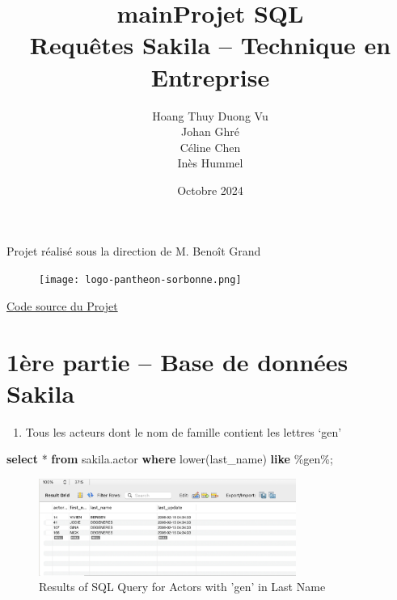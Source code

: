 \documentclass[12pt, french]{article}
\title{main}
\title{\textbf{Projet SQL \\ Requêtes Sakila -- Technique en Entreprise}}
\author{Hoang Thuy Duong Vu \\
        Johan Ghré \\
        Céline Chen \\
        Inès Hummel}
\date{Octobre 2024}
\providecommand{\tightlist}{%
      \setlength{\itemsep}{0pt}\setlength{\parskip}{0pt}}
\newenvironment{Shaded}{}{}
\newcommand{\KeywordTok}[1]{\textcolor[rgb]{0.00,0.44,0.13}{\textbf{{#1}}}}
\newcommand{\StringTok}[1]{\textcolor[rgb]{0.25,0.44,0.63}{{#1}}}
\newcommand{\FunctionTok}[1]{\textcolor[rgb]{0.02,0.16,0.49}{{#1}}}
\newcommand{\NormalTok}[1]{{#1}}
\newcommand{\OperatorTok}[1]{\textcolor[rgb]{0.40,0.40,0.40}{{#1}}}
\begin{document}
\onehalfspacing
\justifying
\maketitle
\thispagestyle{empty}

\vfill
\begin{center}
    Projet réalisé sous la direction de M. Benoît Grand
\end{center}


\begin{figure}[!t] 
    \centering
    \texttt{[image: logo-pantheon-sorbonne.png]}
    \label{Panthéon Sorbonne}
\end{figure}

\vfill
\begin{center}
\href{https://github.com/Meriadoc-gitgit/SQL-SDA24}{Code source du Projet}
\end{center}

\newpage
\tableofcontents

\newpage

    

\section{1ère partie -- Base de données
Sakila}\label{uxe8re-partie-base-de-donnuxe9es-sakila}

\begin{enumerate}
\def\labelenumi{\arabic{enumi}.}
\tightlist
\item
  Tous les acteurs dont le nom de famille contient les lettres `gen'
\end{enumerate}

\begin{Shaded}
\begin{Highlighting}[]
\KeywordTok{select} \OperatorTok{*} \KeywordTok{from}\NormalTok{ sakila.actor}
\KeywordTok{where} \FunctionTok{lower}\NormalTok{(last\_name) }\KeywordTok{like} \StringTok{\textquotesingle{}\%gen\%\textquotesingle{}}\NormalTok{;}
\end{Highlighting}
\end{Shaded}

\begin{figure}[H] %
    \centering
    \includegraphics[width=0.75\textwidth]{res/Q1.png}
    \caption{Results of SQL Query for Actors with 'gen' in Last Name}
    \label{fig:actors_with_gen}
\end{figure}
\end{document}
